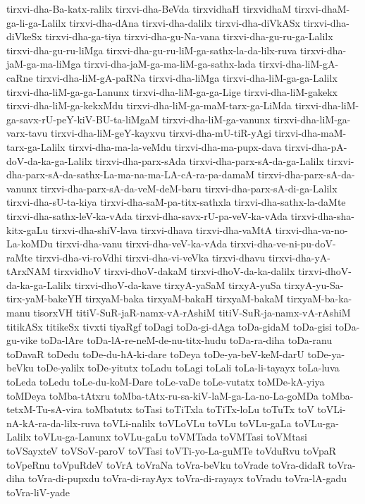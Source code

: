 {tirxvi-dha-Ba-katx-ralilx
tirxvi-dha-BeVda
tirxvidhaH
tirxvidhaM
tirxvi-dhaM-ga-li-ga-Lalilx
tirxvi-dha-dAna
tirxvi-dha-dalilx
tirxvi-dha-diVkASx
tirxvi-dha-diVkeSx
tirxvi-dha-ga-tiya
tirxvi-dha-gu-Na-vana
tirxvi-dha-gu-ru-ga-Lalilx
tirxvi-dha-gu-ru-liMga
tirxvi-dha-gu-ru-liM-ga-sathx-la-da-lilx-ruva
tirxvi-dha-jaM-ga-ma-liMga
tirxvi-dha-jaM-ga-ma-liM-ga-sathx-lada
tirxvi-dha-liM-gA-caRne
tirxvi-dha-liM-gA-paRNa
tirxvi-dha-liMga
tirxvi-dha-liM-ga-ga-Lalilx
tirxvi-dha-liM-ga-ga-Lanunx
tirxvi-dha-liM-ga-ga-Lige
tirxvi-dha-liM-gakekx
tirxvi-dha-liM-ga-kekxMdu
tirxvi-dha-liM-ga-maM-tarx-ga-LiMda
tirxvi-dha-liM-ga-savx-rU-peY-kiV-BU-ta-liMgaM
tirxvi-dha-liM-ga-vanunx
tirxvi-dha-liM-ga-varx-tavu
tirxvi-dha-liM-geY-kayxvu
tirxvi-dha-mU-tiR-yAgi
tirxvi-dha-maM-tarx-ga-Lalilx
tirxvi-dha-ma-la-veMdu
tirxvi-dha-ma-pupx-dava
tirxvi-dha-pA-doV-da-ka-ga-Lalilx
tirxvi-dha-parx-sAda
tirxvi-dha-parx-sA-da-ga-Lalilx
tirxvi-dha-parx-sA-da-sathx-La-ma-na-ma-LA-cA-ra-pa-damaM
tirxvi-dha-parx-sA-da-vanunx
tirxvi-dha-parx-sA-da-veM-deM-baru
tirxvi-dha-parx-sA-di-ga-Lalilx
tirxvi-dha-sU-ta-kiya
tirxvi-dha-saM-pa-titx-sathxla
tirxvi-dha-sathx-la-daMte
tirxvi-dha-sathx-leV-ka-vAda
tirxvi-dha-savx-rU-pa-veV-ka-vAda
tirxvi-dha-sha-kitx-gaLu
tirxvi-dha-shiV-lava
tirxvi-dhava
tirxvi-dha-vaMtA
tirxvi-dha-va-no-La-koMDu
tirxvi-dha-vanu
tirxvi-dha-veV-ka-vAda
tirxvi-dha-ve-ni-pu-doV-raMte
tirxvi-dha-vi-roVdhi
tirxvi-dha-vi-veVka
tirxvi-dhavu
tirxvi-dha-yA-tArxNAM
tirxvidhoV
tirxvi-dhoV-dakaM
tirxvi-dhoV-da-ka-dalilx
tirxvi-dhoV-da-ka-ga-Lalilx
tirxvi-dhoV-da-kave
tirxyA-yaSaM
tirxyA-yuSa
tirxyA-yu-Sa-tirx-yaM-bakeYH
tirxyaM-baka
tirxyaM-bakaH
tirxyaM-bakaM
tirxyaM-ba-ka-manu
tisorxVH
titiV-SuR-jaR-namx-vA-rAshiM
titiV-SuR-ja-namx-vA-rAshiM
titikASx
titikeSx
tivxti
tiyaRgf
toDagi
toDa-gi-dAga
toDa-gidaM
toDa-gisi
toDa-gu-vike
toDa-lAre
toDa-lA-re-neM-de-nu-titx-hudu
toDa-ra-diha
toDa-ranu
toDavaR
toDedu
toDe-du-hA-ki-dare
toDeya
toDe-ya-beV-keM-darU
toDe-ya-beVku
toDe-yalilx
toDe-yitutx
toLadu
toLagi
toLali
toLa-li-tayayx
toLa-luva
toLeda
toLedu
toLe-du-koM-Dare
toLe-vaDe
toLe-vutatx
toMDe-kA-yiya
toMDeya
toMba-tAtxru
toMba-tAtx-ru-sa-kiV-laM-ga-La-no-La-goMDa
toMba-tetxM-Tu-sA-vira
toMbatutx
toTasi
toTiTxla
toTiTx-loLu
toTuTx
toV
toVLi-nA-kA-ra-da-lilx-ruva
toVLi-nalilx
toVLoVLu
toVLu
toVLu-gaLa
toVLu-ga-Lalilx
toVLu-ga-Lanunx
toVLu-gaLu
toVMTada
toVMTasi
toVMtasi
toVSayxteV
toVSoV-paroV
toVTasi
toVTi-yo-La-guMTe
toVduRvu
toVpaR
toVpeRnu
toVpuRdeV
toVrA
toVraNa
toVra-beVku
toVrade
toVra-didaR
toVra-diha
toVra-di-pupxdu
toVra-di-rayAyx
toVra-di-rayayx
toVradu
toVra-lA-gadu
toVra-liV-yade
}
